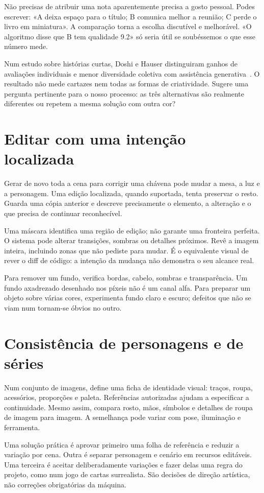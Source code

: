 Não precisas de atribuir uma nota aparentemente precisa a gosto pessoal. Podes escrever: «A deixa espaço para o título; B comunica melhor a reunião; C perde o livro em miniatura». A comparação torna a escolha discutível e melhorável. «O algoritmo disse que B tem qualidade 9.2» só seria útil se soubéssemos o que esse número mede.

Num estudo sobre histórias curtas, Doshi e Hauser distinguiram ganhos de avaliações individuais e menor diversidade coletiva com assistência generativa~\citep{doshi2024}. O resultado não mede cartazes nem todas as formas de criatividade. Sugere uma pergunta pertinente para o nosso processo: as três alternativas são realmente diferentes ou repetem a mesma solução com outra cor?

\section{Editar com uma intenção localizada}
Gerar de novo toda a cena para corrigir uma chávena pode mudar a mesa, a luz e a personagem. Uma edição localizada, quando suportada, tenta preservar o resto. Guarda uma cópia anterior e descreve precisamente o elemento, a alteração e o que precisa de continuar reconhecível.

Uma máscara identifica uma região de edição; não garante uma fronteira perfeita. O sistema pode alterar transições, sombras ou detalhes próximos. Revê a imagem inteira, incluindo zonas que não pediste para mudar. É o equivalente visual de rever o diff de código: a intenção da mudança não demonstra o seu alcance real.

Para remover um fundo, verifica bordas, cabelo, sombras e transparência. Um fundo axadrezado desenhado nos píxeis não é um canal alfa. Para preparar um objeto sobre várias cores, experimenta fundo claro e escuro; defeitos que não se viam num tornam-se óbvios no outro.

\section{Consistência de personagens e de séries}
Num conjunto de imagens, define uma ficha de identidade visual: traços, roupa, acessórios, proporções e paleta. Referências autorizadas ajudam a especificar a continuidade. Mesmo assim, compara rosto, mãos, símbolos e detalhes de roupa de imagem para imagem. A semelhança pode variar com pose, iluminação e ferramenta.

Uma solução prática é aprovar primeiro uma folha de referência e reduzir a variação por cena. Outra é separar personagem e cenário em recursos editáveis. Uma terceira é aceitar deliberadamente variações e fazer delas uma regra do projeto, como num jogo de cartas surrealista. São decisões de direção artística, não correções obrigatórias da máquina.

